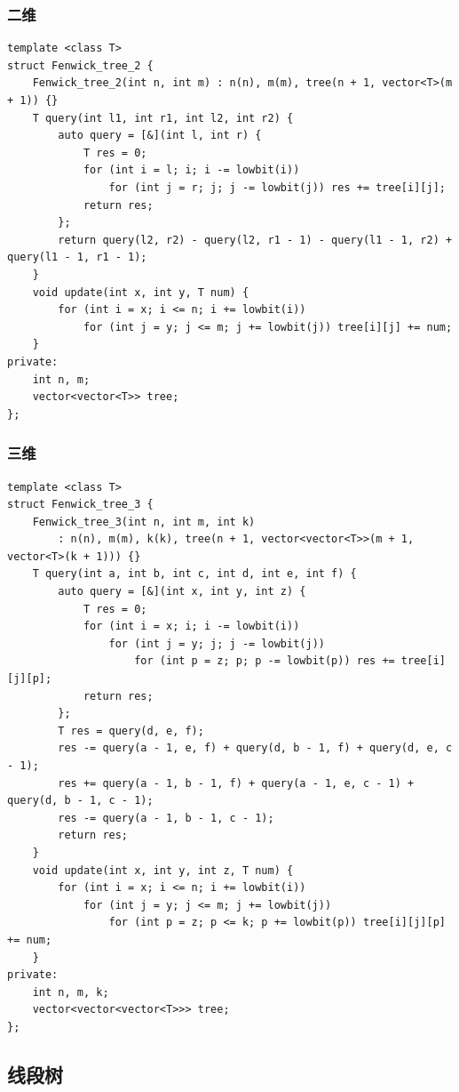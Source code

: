 \documentclass[UTF8, twoside]{ctexart}
\begin{document}
\begin{sloppypar}
\subsubsection{二维}

\begin{lstlisting}[style=cpp]
template <class T>
struct Fenwick_tree_2 {
    Fenwick_tree_2(int n, int m) : n(n), m(m), tree(n + 1, vector<T>(m + 1)) {}
    T query(int l1, int r1, int l2, int r2) {
        auto query = [&](int l, int r) {
            T res = 0;
            for (int i = l; i; i -= lowbit(i))
                for (int j = r; j; j -= lowbit(j)) res += tree[i][j];
            return res;
        };
        return query(l2, r2) - query(l2, r1 - 1) - query(l1 - 1, r2) + query(l1 - 1, r1 - 1);
    }
    void update(int x, int y, T num) {
        for (int i = x; i <= n; i += lowbit(i))
            for (int j = y; j <= m; j += lowbit(j)) tree[i][j] += num;
    }
private:
    int n, m;
    vector<vector<T>> tree;
};
\end{lstlisting}

\subsubsection{三维}

\begin{lstlisting}[style=cpp]
template <class T>
struct Fenwick_tree_3 {
    Fenwick_tree_3(int n, int m, int k)
        : n(n), m(m), k(k), tree(n + 1, vector<vector<T>>(m + 1, vector<T>(k + 1))) {}
    T query(int a, int b, int c, int d, int e, int f) {
        auto query = [&](int x, int y, int z) {
            T res = 0;
            for (int i = x; i; i -= lowbit(i))
                for (int j = y; j; j -= lowbit(j))
                    for (int p = z; p; p -= lowbit(p)) res += tree[i][j][p];
            return res;
        };
        T res = query(d, e, f);
        res -= query(a - 1, e, f) + query(d, b - 1, f) + query(d, e, c - 1);
        res += query(a - 1, b - 1, f) + query(a - 1, e, c - 1) + query(d, b - 1, c - 1);
        res -= query(a - 1, b - 1, c - 1);
        return res;
    }
    void update(int x, int y, int z, T num) {
        for (int i = x; i <= n; i += lowbit(i))
            for (int j = y; j <= m; j += lowbit(j))
                for (int p = z; p <= k; p += lowbit(p)) tree[i][j][p] += num;
    }
private:
    int n, m, k;
    vector<vector<vector<T>>> tree;
};
\end{lstlisting}

\subsection{线段树}


\end{sloppypar}
\end{document}

